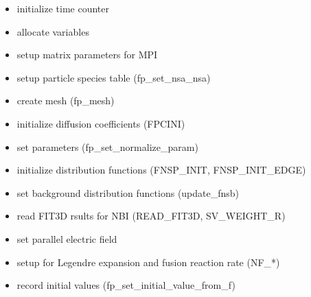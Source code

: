 \documentclass[11pt]{article}
\begin{document}
\begin{itemize}
\begin{itemize}
\begin{itemize}
    \item
      initialize time counter
    \item
      allocate variables
    \item
      setup matrix parameters for MPI
    \item
      setup particle species table (fp\_set\_nsa\_nsa)
    \item
      create mesh (fp\_mesh)
    \item
      initialize diffusion coefficients (FPCINI)
    \item
      set parameters (fp\_set\_normalize\_param)
    \item
      initialize distribution functions (FNSP\_INIT, FNSP\_INIT\_EDGE)
    \item
      set background distribution functions (update\_fnsb)
    \item
      read FIT3D rsults for NBI (READ\_FIT3D, SV\_WEIGHT\_R)
    \item
      set parallel electric field
    \item
      setup for Legendre expansion and fusion reaction rate (NF\_*)
    \item
      record initial values (fp\_set\_initial\_value\_from\_f)
    \end{itemize}
  \end{itemize}


\end{itemize}
\end{document}
